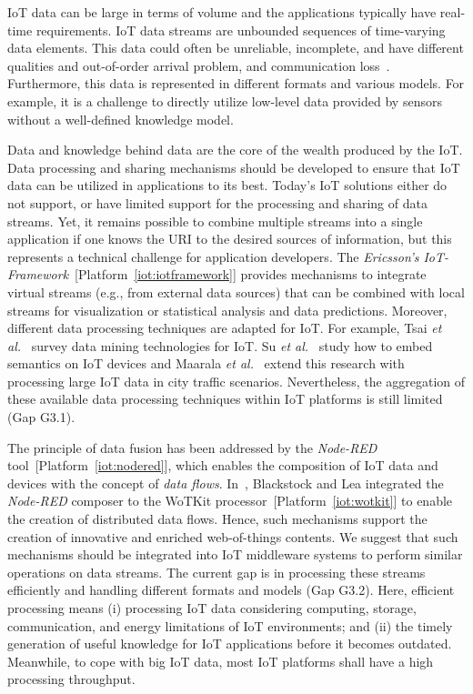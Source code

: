 \documentclass[preprint,10pt,5p]{elsarticle}
\newcommand{\citeiot}[1]{[Platform~\ref{#1}]}
\begin{document}
IoT data can be large in terms of volume and the applications typically 
have real-time requirements. 
IoT data streams are unbounded sequences of time-varying data elements. 
This data could often be unreliable, incomplete, and have different
qualities and out-of-order arrival problem, and communication
loss~\cite{Gubbi2013}. 
Furthermore, this data is represented in different
formats and various models. For example, it is a challenge to directly
utilize low-level data provided by sensors without a well-defined knowledge
model.


Data and knowledge behind data are the core of the wealth produced by the IoT.
Data processing and sharing mechanisms should be
developed to ensure that IoT data can be utilized in applications to its best.
Today's IoT solutions either do not support, or have limited support for the 
processing and sharing of data streams.
Yet, it remains possible to combine multiple streams into a single application 
if one knows the URI to the desired sources of information, but this represents
a technical challenge for application developers.
The \emph{Ericsson's IoT-Framework}~\citeiot{iot:iotframework}
provides mechanisms to integrate virtual streams (e.g., from 
external data sources) that can be combined with local streams for
visualization or statistical analysis and data predictions.
Moreover, different data processing techniques are adapted for IoT. 
For example, Tsai \textit{et al.}~\cite{Tsai2014} survey data mining
technologies for IoT. Su \textit{et al.}~\cite{Su2015} study how to
embed semantics on IoT devices and Maarala \textit{et
  al.}~\cite{Maarala2014} extend this research with processing large
IoT data in city traffic scenarios.
Nevertheless, the aggregation of these available data processing
techniques within IoT platforms is still limited (Gap G3.1).

The principle of data fusion has been addressed by the
\emph{Node-RED} tool~\citeiot{iot:nodered}, which enables the
composition of IoT data and devices with the concept of 
\emph{data flows}. In~\cite{Blackstock2014}, Blackstock and Lea
integrated the \emph{Node-RED} composer to the WoTKit
processor~\citeiot{iot:wotkit} to enable the creation of distributed
data flows.
Hence, such mechanisms support the creation of innovative and enriched
web-of-things contents. 
We suggest that such mechanisms should be integrated into IoT middleware
systems to perform similar operations on data streams. 
The current gap is in processing these streams efficiently and 
handling different formats and models (Gap G3.2). 
Here, efficient processing means (i) processing IoT data
considering computing, storage, communication, and energy
limitations of IoT environments; and (ii) the timely generation of useful
knowledge for IoT applications before it becomes outdated.
Meanwhile, to cope with big IoT data, most
IoT platforms shall have a high processing throughput. 
\end{document}

